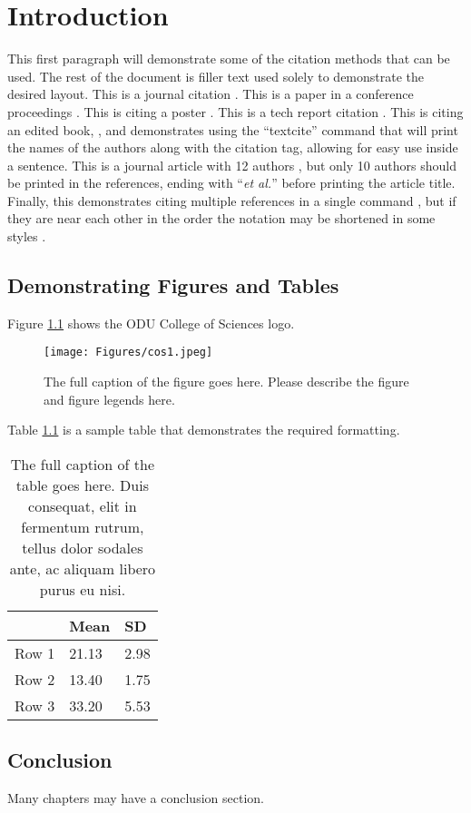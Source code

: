 \chapter{Introduction} 
This first paragraph will demonstrate some of the citation methods that can be used. The rest of the document is filler text used solely to demonstrate the desired layout.  This is a journal citation \autocite{berlin-tweb23}. This is a paper in a conference proceedings \autocite{weigle-jcdl23}. This is citing a poster \autocite{jayanetti-sbp23}. This is a tech report citation \autocite{weigle-2023}. This is citing an edited book, \textcite{vanet-book}, and demonstrates using the ``textcite'' command that will print the names of the authors along with the citation tag, allowing for easy use inside a sentence.  This is a journal article with 12 authors \autocite{coifman2005geometric}, but only 10 authors should be printed in the references, ending with ``\emph{et al.}'' before printing the article title.  Finally, this  demonstrates citing multiple references in a single command \autocites{jones-memento21,vanet-book,weigle-jcdl23}, but if they are near each other in the order the notation may be shortened in some styles \autocites{berlin-tweb23, weigle-jcdl23, jayanetti-sbp23}.

\section{Demonstrating Figures and Tables}
Figure \ref{fig:cos1} shows the ODU College of Sciences logo.
\begin{figure}[tbh]
  \centering
  \texttt{[image: Figures/cos1.jpeg]}
  \caption[The short caption of the figure goes here.]{The full caption of the figure goes here. Please describe the figure and figure legends here.}
  \label{fig:cos1}
\end{figure}

Table \ref{tab:table_example1} is a sample table that demonstrates the required formatting.
\begin{table}[tbh]
\caption[The short caption of the table goes here.]{The full caption of the table goes here. Duis consequat, elit in fermentum rutrum, tellus dolor sodales ante, ac aliquam libero purus eu nisi.}
\label{tab:table_example1}
\begin{center}
\begin{tabular}{lll}
      & Mean  & SD   \\ \hline
Row 1 & 21.13 & 2.98 \\ 
Row 2 & 13.40 & 1.75 \\ 
Row 3 & 33.20 & 5.53 \\ \hline
\end{tabular}
\end{center}
\end{table}

\section{Conclusion}
Many chapters may have a conclusion section.